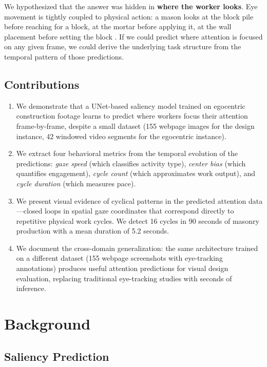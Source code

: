\documentclass{article}
\begin{document}
We hypothesized that the answer was hidden in \textbf{where the worker looks}. Eye movement is tightly coupled to physical action: a mason looks at the block pile before reaching for a block, at the mortar before applying it, at the wall placement before setting the block \citep{hayhoe2005eye, land2009vision}. If we could predict where attention is focused on any given frame, we could derive the underlying task structure from the temporal pattern of those predictions.

\subsection{Contributions}

\begin{enumerate}
    \item We demonstrate that a UNet-based saliency model trained on egocentric construction footage learns to predict where workers focus their attention frame-by-frame, despite a small dataset (155 webpage images for the design instance, 42 windowed video segments for the egocentric instance).

    \item We extract four behavioral metrics from the temporal evolution of the predictions: \textit{gaze speed} (which classifies activity type), \textit{center bias} (which quantifies engagement), \textit{cycle count} (which approximates work output), and \textit{cycle duration} (which measures pace).

    \item We present visual evidence of cyclical patterns in the predicted attention data—closed loops in spatial gaze coordinates that correspond directly to repetitive physical work cycles. We detect 16 cycles in 90 seconds of masonry production with a mean duration of 5.2 seconds.

    \item We document the cross-domain generalization: the same architecture trained on a different dataset (155 webpage screenshots with eye-tracking annotations) produces useful attention predictions for visual design evaluation, replacing traditional eye-tracking studies with seconds of inference.
\end{enumerate}

\section{Background}

\subsection{Saliency Prediction}
\end{document}
